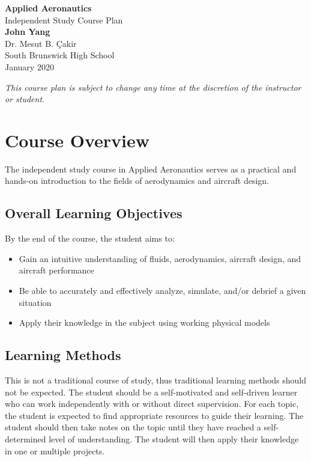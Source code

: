 \documentclass[12pt]{article}
\begin{document}
	\begin{titlepage}
		\begin{center}
			\vspace*{1cm}
			\Huge
				\textbf{Applied Aeronautics}\\
			\vspace{0.5cm}
			\LARGE
				Independent Study Course Plan\\
			\vspace{1.5cm}
				\textbf{John Yang}\\
			\vfill
			\vspace{0.8cm}
			\Large
				Dr. Mesut B. \c{C}akir\\
				South Brunswick High School\\
				January 2020
		\end{center}
	\end{titlepage}

\tableofcontents\newpage

\textit{This course plan is subject to change any time at the discretion of the instructor or student.}

\section{Course Overview}
The independent study course in Applied Aeronautics serves as a practical and hands-on introduction to the fields of aerodynamics and aircraft design.
	\subsection{Overall Learning Objectives}
		By the end of the course, the student aims to:
			\begin{itemize}
				\item Gain an intuitive understanding of fluids, aerodynamics, aircraft design, and aircraft performance
				\item Be able to accurately and effectively analyze, simulate, and/or debrief a given situation
				\item Apply their knowledge in the subject using working physical models
			\end{itemize}
	\subsection{Learning Methods}
		This is not a traditional course of study, thus traditional learning methods should not be expected. The student should be a self-motivated and self-driven learner who can work independently with or without direct supervision. For each topic, the student is expected to find appropriate resources to guide their learning. The student should then take notes on the topic until they have reached a self-determined level of understanding. The student will then apply their knowledge in one or multiple projects. 
\end{document}
